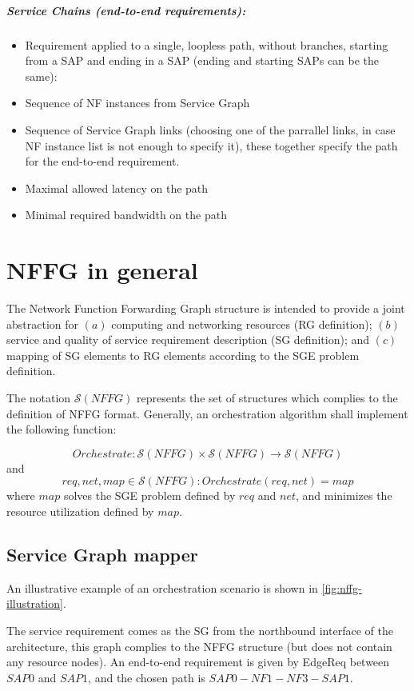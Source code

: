 \documentclass[a4paper,10pt]{scrartcl}
\begin{document}
\subparagraph{Service Chains (end-to-end requirements):}
\begin{itemize}
\item Requirement applied to a single, loopless path, without branches, starting from a SAP and ending in a SAP (ending and starting SAPs can be the same):
\item Sequence of NF instances from Service Graph
\item Sequence of Service Graph links (choosing one of the parrallel links, in case NF instance list is not enough to specify it), these together specify the path for the end-to-end requirement.
\item Maximal allowed latency on the path
\item Minimal required bandwidth on the path
\end{itemize}

\section{NFFG in general}

The Network Function Forwarding Graph structure is intended to provide a joint abstraction for 
$(a)$ computing and networking resources (RG definition); 
$(b)$ service and quality of service requirement description (SG definition); and 
$(c)$  mapping of SG elements to RG elements according to the SGE problem definition. 

The notation $\mathcal{S}(NFFG)$ represents the set of structures which complies to the definition of NFFG format.
Generally, an orchestration algorithm shall implement the following function:

$$ Orchestrate: \mathcal{S}(NFFG) \times \mathcal{S}(NFFG) \rightarrow \mathcal{S}(NFFG) $$
and
$$ req, net, map \in \mathcal{S}(NFFG): Orchestrate (req, net) = map $$
where $map$ solves the SGE problem defined by $req$ and $net$, and minimizes the resource utilization defined by $map$.

\subsection{Service Graph mapper}

An illustrative example of an orchestration scenario is shown in \ref{fig:nffg-illustration}. 

The service requirement comes as the SG from the northbound interface of the architecture, 
this graph complies to the NFFG structure (but does not contain any resource nodes). 
An end-to-end requirement is given by EdgeReq between $SAP0$ and $SAP1$, and the chosen path is $SAP0-NF1-NF3-SAP1$.
\end{document}
